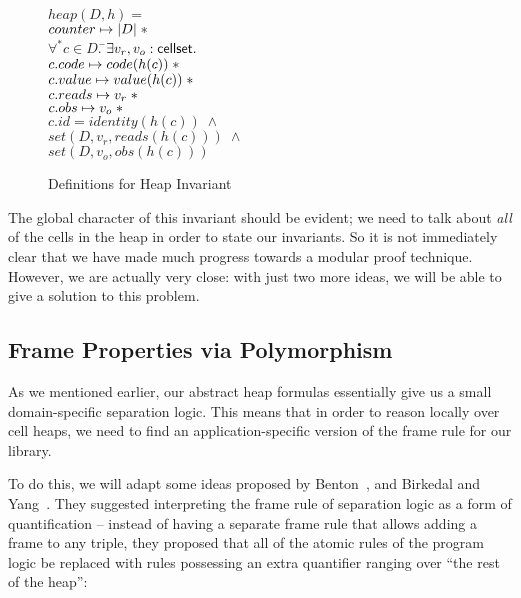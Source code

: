 \begin{figure}
\begin{tabbing}
$heap(D,h) = $ \\
\;\;$counter \mapsto |D| \;* $ \\
\;\;$\forall^* c \in D.\;$\=$\exists v_r, v_o : \mathsf{cellset}.\;$ \\
                         \>$c.code \mapsto code(h(c))   \;* $ \\
                         \>$c.value \mapsto value(h(c)) \;* $ \\
                         \>$c.reads \mapsto v_r \;* $ \\
                         \>$c.obs   \mapsto v_o \;* $ \\
                         \>$c.id    = identity(h(c)) \;\land$ \\
                         \>$set(D, v_r, reads(h(c))) \;\land$ \\
                         \>$set(D, v_o, obs(h(c)))$ 
\end{tabbing}

\caption{Definitions for Heap Invariant}
\label{heap-invariant}
\end{figure}


The global character of this invariant should be evident; we need to
talk about \emph{all} of the cells in the heap in order to state our
invariants. So it is not immediately clear that we have made much
progress towards a modular proof technique. However, we are actually
very close: with just two more ideas, we will be able to give a
solution to this problem.

\subsection{Frame Properties via Polymorphism}

As we mentioned earlier, our abstract heap formulas essentially give
us a small domain-specific separation logic. This means that in order
to reason locally over cell heaps, we need to find an
application-specific version of the frame rule for our library. 

To do this, we will adapt some ideas proposed by
Benton~\cite{benton}, and Birkedal and Yang~\cite{birkedal-yang}. They
suggested interpreting the frame rule of separation logic as a form of
quantification -- instead of having a separate frame rule that allows
adding a frame to any triple, they proposed that all of the atomic
rules of the program logic be replaced with rules possessing an extra
quantifier ranging over ``the rest of the heap'':

